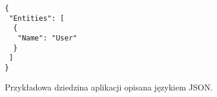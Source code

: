 \begin{figure}[!ht]
\begin{verbatim}
{
 "Entities": [
  {
   "Name": "User"
  }
 ]
}
\end{verbatim}

\caption{Przykładowa dziedzina aplikacji opisana językiem JSON.}
\label{fig:implementation_core:json}
\end{figure}
